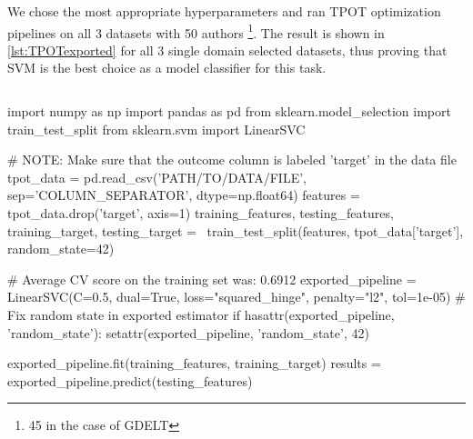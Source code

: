 We chose the most appropriate hyperparameters and ran TPOT optimization pipelines on all 3 datasets with 50 authors \footnote{45 in the case of GDELT}. The result is shown in \autoref{lst:TPOTexported} for all 3 single domain selected datasets, thus proving that SVM is the best choice as a model classifier for this task.

\begin{lstlisting}[frame=none,caption={TPOT pipeline extracted.},captionpos=b,label=lst:TPOTexported]
\end{lstlisting}
\begin{python}	
	import numpy as np
	import pandas as pd
	from sklearn.model_selection import train_test_split
	from sklearn.svm import LinearSVC
	
	# NOTE: Make sure that the outcome column is labeled 'target' in the data file
	tpot_data = pd.read_csv('PATH/TO/DATA/FILE', sep='COLUMN_SEPARATOR', dtype=np.float64)
	features = tpot_data.drop('target', axis=1)
	training_features, testing_features, training_target, testing_target = \
	train_test_split(features, tpot_data['target'], random_state=42)
	
	# Average CV score on the training set was: 0.6912
	exported_pipeline = LinearSVC(C=0.5, dual=True, loss="squared_hinge", penalty="l2", tol=1e-05)
	# Fix random state in exported estimator
	if hasattr(exported_pipeline, 'random_state'):
	setattr(exported_pipeline, 'random_state', 42)
	
	exported_pipeline.fit(training_features, training_target)
	results = exported_pipeline.predict(testing_features)
\end{python}
